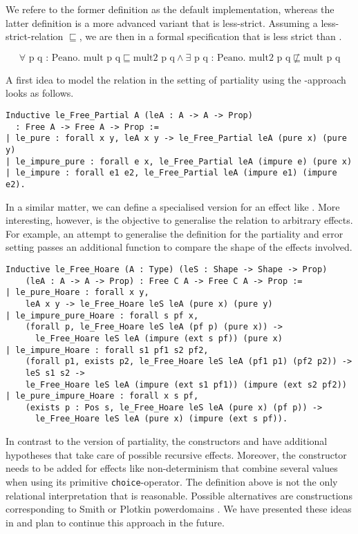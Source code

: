 We refere to the former definition as the default implementation, whereas the latter definition is a more advanced variant that is less-strict.
Assuming a less-strict-relation $\sqsubseteq$, we are then  in a formal specification that  is less strict than .

\[
\forall \text{ p q : Peano}. \text{ mult p q} \sqsubseteq \text{mult2
  p q} \wedge \exists \text{ p q : Peano}. \text{ mult2 p q} \not \sqsubseteq \text{mult p q}
\]

A first idea to model the relation in the setting of partiality using the -approach looks as follows.

\begin{verbatim}
Inductive le_Free_Partial A (leA : A -> A -> Prop)
  : Free A -> Free A -> Prop :=
| le_pure : forall x y, leA x y -> le_Free_Partial leA (pure x) (pure y)
| le_impure_pure : forall e x, le_Free_Partial leA (impure e) (pure x)
| le_impure : forall e1 e2, le_Free_Partial leA (impure e1) (impure e2).
\end{verbatim}

In a similar matter, we can define a specialised version for an effect like .
More interesting, however, is the objective to generalise the relation to arbitrary effects.
For example, an attempt to generalise the definition for the partiality and error setting passes an additional function to compare the shape of the effects involved.

\begin{verbatim}
Inductive le_Free_Hoare (A : Type) (leS : Shape -> Shape -> Prop)
    (leA : A -> A -> Prop) : Free C A -> Free C A -> Prop :=
| le_pure_Hoare : forall x y,
    leA x y -> le_Free_Hoare leS leA (pure x) (pure y)
| le_impure_pure_Hoare : forall s pf x,
    (forall p, le_Free_Hoare leS leA (pf p) (pure x)) ->
      le_Free_Hoare leS leA (impure (ext s pf)) (pure x)
| le_impure_Hoare : forall s1 pf1 s2 pf2,
    (forall p1, exists p2, le_Free_Hoare leS leA (pf1 p1) (pf2 p2)) ->
    leS s1 s2 ->
    le_Free_Hoare leS leA (impure (ext s1 pf1)) (impure (ext s2 pf2))
| le_pure_impure_Hoare : forall x s pf,
    (exists p : Pos s, le_Free_Hoare leS leA (pure x) (pf p)) ->
      le_Free_Hoare leS leA (pure x) (impure (ext s pf)).
\end{verbatim}

In contrast to the version of partiality, the constructors  and  have additional hypotheses that take care of possible recursive effects.
Moreover, the constructor  needs to be added for effects like non-determinism that combine several values when using its primitive \texttt{choice}-operator.
The definition above is not the only relational interpretation that is reasonable.
Possible alternatives are constructions corresponding to Smith or Plotkin powerdomains \citep{abramsky1994domain}.
We have presented these ideas in \citet{christiansen2019proving} and plan to continue this approach in the future.

